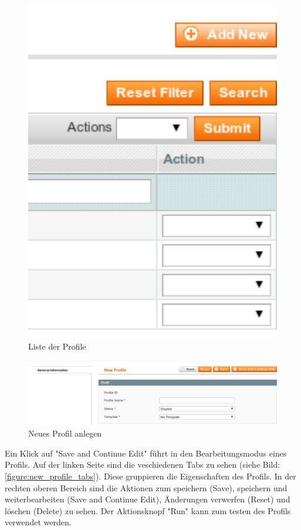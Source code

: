 \documentclass[a4paper,12pt]{book}
\begin{document}
\begin{figure}
 \includegraphics[width=1\textwidth]{img/bild02.png}
  \caption{Liste der Profile}
  \label{figure:profile_list}
\end{figure}

\begin{figure}
 \includegraphics[width=1\textwidth]{img/bild03.png}
  \caption{Neues Profil anlegen}
  \label{figure:new_profile}
\end{figure}

Ein Klick auf "Save and Continue Edit" führt in den
Bearbeitungsmodus eines Profils. Auf der linken Seite sind die
veschiedenen Tabs zu sehen (siehe Bild: \ref{figure:new_profile_tabs}). 
Diese gruppieren die Eigenschaften des
Profils. In der rechten oberen Bereich sind die Aktionen zum
speichern (Save), speichern und weiterbearbeiten (Save and Continue
Edit), Änderungen verwerfen (Reset) und löschen (Delete) zu sehen.
Der Aktionsknopf "Run" kann zum testen des Profils verwendet werden.
\end{document}
